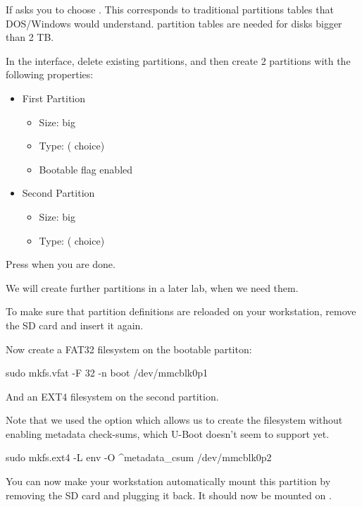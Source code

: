 

If  asks you to  choose .
This corresponds to traditional partitions tables that DOS/Windows would 
understand.  partition tables are needed for disks bigger than 2 TB.

In the  interface, delete existing partitions, and then create 2
partitions with the following properties:

\begin{itemize}
\item First Partition
\begin{itemize}
  \item Size:  big
  \item Type:   ( choice)
  \item Bootable flag enabled
\end{itemize}

\item Second Partition
\begin{itemize}
  \item Size:  big
  \item Type:   ( choice)
\end{itemize}
\end{itemize}


Press  when you are done.

We will create further partitions in a later lab, when we need them.

To make sure that partition definitions are reloaded on your
workstation, remove the SD card and insert it again.

Now create a FAT32 filesystem on the bootable partiton:
\begin{bashinput}
sudo mkfs.vfat -F 32 -n boot /dev/mmcblk0p1
\end{bashinput}

And an EXT4 filesystem on the second partition.

Note that we used the  option which allows us to create
the filesystem without enabling metadata check-sums, which U-Boot doesn't
seem to support yet.
\begin{bashinput}
sudo mkfs.ext4 -L env -O ^metadata_csum /dev/mmcblk0p2
\end{bashinput}

You can now make your workstation automatically mount this
partition by removing the SD card and plugging it back. It should
now be mounted on .

